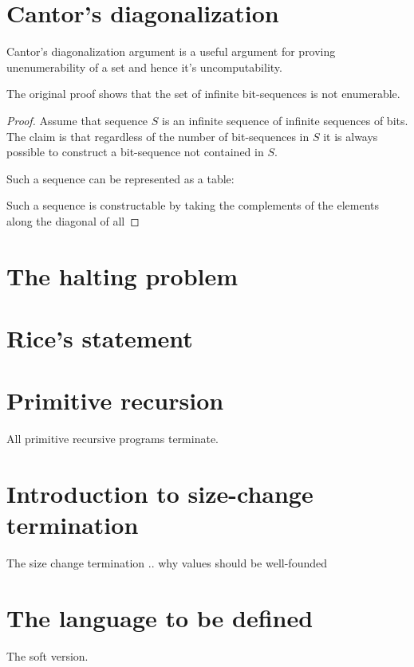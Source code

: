 
\section{Cantor's diagonalization}

Cantor's diagonalization argument is a useful argument for proving
unenumerability of a set and hence it's uncomputability.

The original proof shows that the set of infinite bit-sequences is not
enumerable.

\begin{proof} Assume that sequence $S$ is an infinite sequence of infinite
sequences of bits. The claim is that regardless of the number of bit-sequences
in $S$ it is always possible to construct a bit-sequence not contained in $S$.

Such a sequence can be represented as a table:


Such a sequence is constructable by taking the complements of the elements along the diagonal of all 



\end{proof}


\section{The halting problem}

\section{Rice's statement}


\section{Primitive recursion}

All primitive recursive programs terminate.

\section{Introduction to size-change termination}

The size change termination .. why values should be well-founded

\section{The language to be defined}

The soft version.
